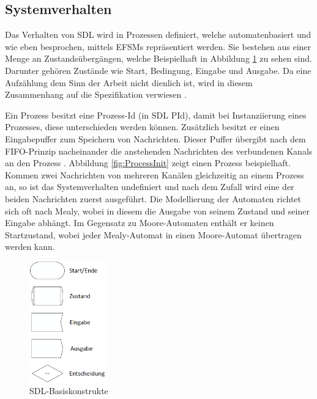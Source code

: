 \subsection{Systemverhalten}
\label{ssc:Verhalten}
Das Verhalten von \ac{SDL} wird in Prozessen definiert, welche automatenbasiert und wie eben besprochen, mittels \ac{EFSM}s repräsentiert werden. Sie bestehen aus einer Menge an Zustandsübergängen, welche Beispielhaft in Abbildung \ref{fig:Basiskonstrukte} zu sehen sind. Darunter gehören Zustände wie Start, Bedingung, Eingabe und Ausgabe. Da eine Aufzählung dem Sinn der Arbeit nicht dienlich ist, wird in diesem Zusammenhang auf die Spezifikation verwiesen \cite[44 \psqq]{ITUT101_2016}.


Ein Prozess besitzt eine Prozess-Id (in \ac{SDL} PId), damit bei Instanziierung eines Prozesses, diese unterschieden werden können. Zusätzlich besitzt er einen Eingabepuffer zum Speichern von Nachrichten. Dieser Puffer übergibt nach dem \ac{FIFO}-Prinzip nacheinander die anstehenden Nachrichten des verbundenen Kanals an den Prozess \cite[42]{ITUT101_2016}. Abbildung \ref{fig:ProcessInit} zeigt einen Prozess beispielhaft. Kommen zwei Nachrichten von mehreren Kanälen gleichzeitig an einem Prozess an, so ist das Systemverhalten undefiniert und nach dem Zufall wird eine der beiden Nachrichten zuerst ausgeführt.
Die Modellierung der Automaten richtet sich oft nach Mealy, wobei in diesem die Ausgabe von seinem Zustand und seiner Eingabe abhängt.
Im Gegensatz zu Moore-Automaten enthält er keinen Startzustand, wobei jeder Mealy-Automat in einen Moore-Automat übertragen werden kann.
\begin{figure}[ht]
	\centering
	\includegraphics[width=0.3\textwidth]{Graphics/Basiskonstrukte.png}
	\caption{SDL-Basiskonstrukte}
	\label{fig:Basiskonstrukte}
\end{figure}

